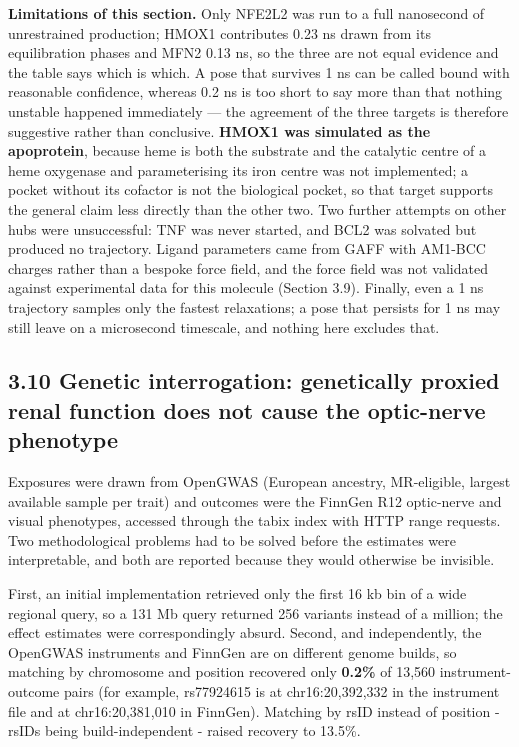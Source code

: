 \documentclass[utf8]{FrontiersinVancouver}
\begin{document}
\textbf{Limitations of this section.} Only NFE2L2 was run to a full nanosecond of unrestrained production; HMOX1 contributes 0.23 ns drawn from its equilibration phases and MFN2 0.13 ns, so the three are not equal evidence and the table says which is which. A pose that survives 1 ns can be called bound with reasonable confidence, whereas 0.2 ns is too short to say more than that nothing unstable happened immediately --- the agreement of the three targets is therefore suggestive rather than conclusive. \textbf{HMOX1 was simulated as the apoprotein}, because heme is both the substrate and the catalytic centre of a heme oxygenase and parameterising its iron centre was not implemented; a pocket without its cofactor is not the biological pocket, so that target supports the general claim less directly than the other two. Two further attempts on other hubs were unsuccessful: TNF was never started, and BCL2 was solvated but produced no trajectory. Ligand parameters came from GAFF with AM1-BCC charges rather than a bespoke force field, and the force field was not validated against experimental data for this molecule (Section 3.9). Finally, even a 1 ns trajectory samples only the fastest relaxations; a pose that persists for 1 ns may still leave on a microsecond timescale, and nothing here excludes that.

\subsection{3.10 Genetic interrogation: genetically proxied renal function does not cause the optic-nerve phenotype}

Exposures were drawn from OpenGWAS (European ancestry, MR-eligible, largest available sample per trait) and outcomes were the FinnGen R12 optic-nerve and visual phenotypes, accessed through the tabix index with HTTP range requests. Two methodological problems had to be solved before the estimates were interpretable, and both are reported because they would otherwise be invisible.

First, an initial implementation retrieved only the first 16 kb bin of a wide regional query, so a 131 Mb query returned 256 variants instead of a million; the effect estimates were correspondingly absurd. Second, and independently, the OpenGWAS instruments and FinnGen are on different genome builds, so matching by chromosome and position recovered only \textbf{0.2\%} of 13,560 instrument-outcome pairs (for example, rs77924615 is at chr16:20,392,332 in the instrument file and at chr16:20,381,010 in FinnGen). Matching by rsID instead of position - rsIDs being build-independent - raised recovery to 13.5\%.
\end{document}
